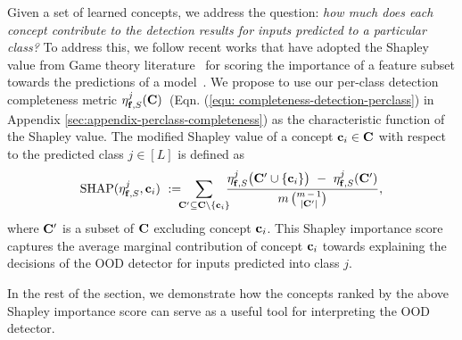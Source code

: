 Given a set of learned concepts, we address the question: {\em how much does each concept contribute to the detection results for inputs predicted to a particular class?}
To address this, we follow recent works that have adopted the Shapley value from Game theory literature~\citep{shapley1953value,fujimoto2006axiomatic} for scoring the importance of a feature subset towards the predictions of a model~\citep{chen2018shapley,lundberg2017shapley,sundararajan2020shapley}.
We propose to use our per-class detection completeness metric $\eta^{j}_{\mathbf{f}, S}(\mathbf{C})\,$ (Eqn. (\ref{equ: completeness-detection-perclass}) in Appendix \ref{sec:appendix-perclass-completeness}) as the characteristic function of the Shapley value. 
The modified Shapley value of a concept $\mathbf{c}_i \in \mathbf{C}$ with respect to the predicted class $j \in [L]$ is defined as
\begin{align}
    \label{equ: ConceptSHAP}
    \textrm{SHAP}(\eta^{j}_{\mathbf{f}, S}, \mathbf{c}_i) ~:= \!\!\!\sum_{\mathbf{C}' \subseteq \mathbf{C} \setminus \{\mathbf{c}_i\}} \!\!\! \frac{ \eta^{j}_{\mathbf{f}, S}\big( \mathbf{C}' \cup \{\mathbf{c}_i\} \big) ~-~ \eta^{j}_{\mathbf{f}, S}(\mathbf{C}') }{ m\, \binom{m \,-\, 1}{|\mathbf{C}'|} },
\end{align}
where $\mathbf{C}'$ is a subset of $\mathbf{C}$ excluding concept $\mathbf{c}_i$.
This Shapley importance score captures the average marginal contribution of concept $\mathbf{c}_i$ towards explaining the decisions of the OOD detector for inputs predicted into class $j$.

In the rest of the section, we demonstrate how the concepts ranked by the above Shapley importance score can serve as a useful tool for interpreting the OOD detector.


